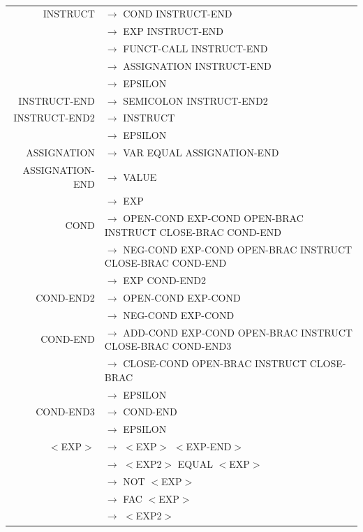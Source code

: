 \documentclass[a4paper,10pt]{article}
\begin{document}
~\\

\hspace{-3.5cm}\begin{tabular}{rl}


INSTRUCT			& $\rightarrow$ COND INSTRUCT-END \\					
					& $\rightarrow$ EXP INSTRUCT-END \\					
					& $\rightarrow$ FUNCT-CALL INSTRUCT-END \\					
					& $\rightarrow$ ASSIGNATION INSTRUCT-END \\
					& $\rightarrow$ EPSILON \\

INSTRUCT-END		& $\rightarrow$ SEMICOLON INSTRUCT-END2\\

INSTRUCT-END2		& $\rightarrow$ INSTRUCT\\
					& $\rightarrow$ EPSILON \\
					

ASSIGNATION			& $\rightarrow$ VAR EQUAL ASSIGNATION-END \\

ASSIGNATION-END		& $\rightarrow$ VALUE \\
					& $\rightarrow$ EXP \\
					
COND				& $\rightarrow$ OPEN-COND EXP-COND OPEN-BRAC INSTRUCT CLOSE-BRAC COND-END\\
					& $\rightarrow$ NEG-COND EXP-COND OPEN-BRAC INSTRUCT CLOSE-BRAC COND-END\\
					& $\rightarrow$ EXP COND-END2 \\

COND-END2			& $\rightarrow$ OPEN-COND EXP-COND \\
					& $\rightarrow$ NEG-COND EXP-COND \\


COND-END			& $\rightarrow$ ADD-COND EXP-COND OPEN-BRAC INSTRUCT CLOSE-BRAC COND-END3 \\
					& $\rightarrow$ CLOSE-COND OPEN-BRAC INSTRUCT CLOSE-BRAC\\
					& $\rightarrow$ EPSILON \\	
					
COND-END3			& $\rightarrow$ COND-END \\
					& $\rightarrow$ EPSILON \\					

$<$EXP$>$			& $\rightarrow$ $<$EXP$>$ $<$EXP-END$>$\\
					& $\rightarrow$ $<$EXP2$>$ EQUAL $<$EXP$>$\\
					& $\rightarrow$ NOT $<$EXP$>$ \\
					& $\rightarrow$ FAC $<$EXP$>$ \\
					& $\rightarrow$ $<$EXP2$>$ \\
					

\end{tabular}
\end{document}
